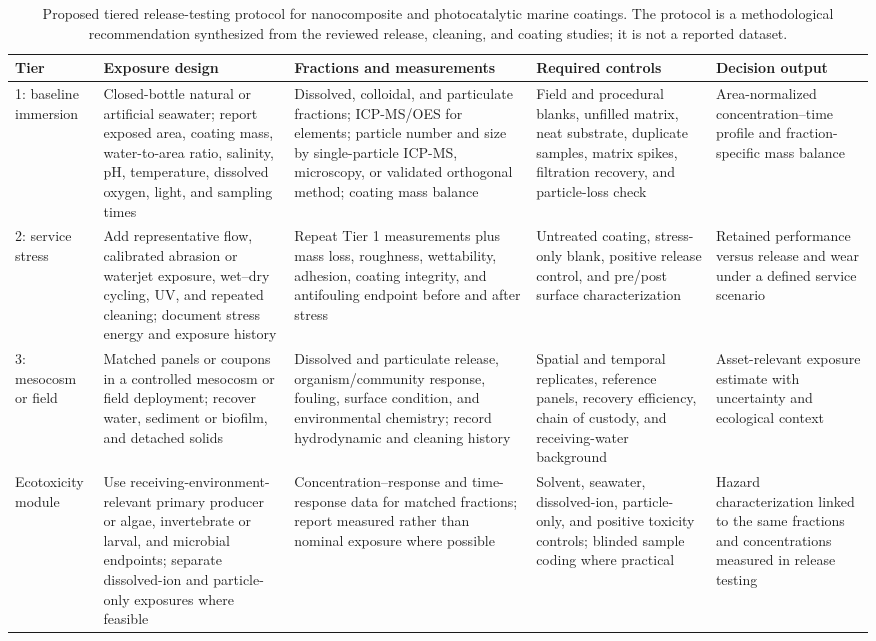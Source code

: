 \begin{table}[t]
\centering
\caption{Proposed tiered release-testing protocol for nanocomposite and photocatalytic marine coatings. The protocol is a methodological recommendation synthesized from the reviewed release, cleaning, and coating studies; it is not a reported dataset.}
\label{tab:release_protocol}
\small
\begin{tabularx}{\textwidth}{l l X X X}
\toprule
Tier & Exposure design & Fractions and measurements & Required controls & Decision output \\
\midrule
1: baseline immersion & Closed-bottle natural or artificial seawater; report exposed area, coating mass, water-to-area ratio, salinity, pH, temperature, dissolved oxygen, light, and sampling times & Dissolved, colloidal, and particulate fractions; ICP-MS/OES for elements; particle number and size by single-particle ICP-MS, microscopy, or validated orthogonal method; coating mass balance & Field and procedural blanks, unfilled matrix, neat substrate, duplicate samples, matrix spikes, filtration recovery, and particle-loss check & Area-normalized concentration--time profile and fraction-specific mass balance \\
2: service stress & Add representative flow, calibrated abrasion or waterjet exposure, wet--dry cycling, UV, and repeated cleaning; document stress energy and exposure history & Repeat Tier 1 measurements plus mass loss, roughness, wettability, adhesion, coating integrity, and antifouling endpoint before and after stress & Untreated coating, stress-only blank, positive release control, and pre/post surface characterization & Retained performance versus release and wear under a defined service scenario \\
3: mesocosm or field & Matched panels or coupons in a controlled mesocosm or field deployment; recover water, sediment or biofilm, and detached solids & Dissolved and particulate release, organism/community response, fouling, surface condition, and environmental chemistry; record hydrodynamic and cleaning history & Spatial and temporal replicates, reference panels, recovery efficiency, chain of custody, and receiving-water background & Asset-relevant exposure estimate with uncertainty and ecological context \\
Ecotoxicity module & Use receiving-environment-relevant primary producer or algae, invertebrate or larval, and microbial endpoints; separate dissolved-ion and particle-only exposures where feasible & Concentration--response and time-response data for matched fractions; report measured rather than nominal exposure where possible & Solvent, seawater, dissolved-ion, particle-only, and positive toxicity controls; blinded sample coding where practical & Hazard characterization linked to the same fractions and concentrations measured in release testing \\
\bottomrule
\end{tabularx}
\end{table}
